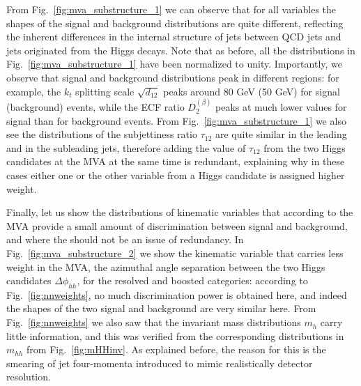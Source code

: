 From Fig.~\ref{fig:mva_substructure_1}
we can observe that for all variables the shapes of the signal
and background distributions are quite different,
reflecting the inherent differences in the internal structure of jets
between QCD jets and jets originated from the Higgs decays.
%
Note that as before, all the distributions in
Fig.~\ref{fig:mva_substructure_1}
have been normalized to unity.
%
Importantly, we observe that signal and background distributions peak
in different regions: for example, the $k_t$ splitting scale $\sqrt{d_{12}}$
peaks around 80 GeV (50 GeV) for signal (background) events, while
the ECF ratio $D_2^{(\beta)}$ peaks at much lower values for signal than
for background events.
%
From Fig.~\ref{fig:mva_substructure_1} we also see
the distributions of the subjettiness ratio $\tau_{12}$ are quite similar
in the leading and in the subleading jets, therefore adding the value
of  $\tau_{12}$ from the two Higgs candidates at the MVA at the same time
is redundant, explaining why in these cases either one or the other
variable from a Higgs candidate is assigned higher weight.


Finally, let us show the distributions of kinematic variables
that according to the MVA provide a small amount of discrimination
between signal and background, and where the should not be an issue
of redundancy.
%
In Fig.~\ref{fig:mva_substructure_2}
we show the kinematic variable that carries less weight in the MVA,
    the azimuthal angle separation between the two Higgs candidates
    $\Delta\phi_{hh}$, for the resolved and boosted categories:
    according to Fig.~\ref{fig:nnweights}, no much discrimination power
    is obtained here, and indeed the shapes of the two signal
    and background
    are very similar here.
    From Fig.~\ref{fig:nnweights} we also saw that the
    invariant mass distributions $m_h$ carry little information,
    and this was verified from 
the corresponding
distributions in $m_{hh}$ from Fig.~\ref{fig:mHHinv}.
%
As explained before, the reason for this is
the  smearing of jet four-momenta introduced to mimic
realistically detector resolution.


